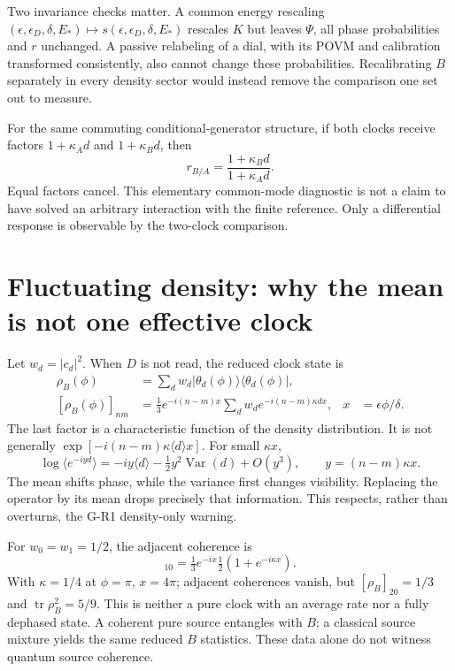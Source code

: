 \documentclass[11pt,a4paper]{article}
\newcommand{\tr}{\operatorname{tr}}
\newcommand{\ket}[1]{|#1\rangle}
\newcommand{\bra}[1]{\langle#1|}
\newcommand{\pr}[1]{\ket{#1}\bra{#1}}
\begin{document}
Two invariance checks matter. A common energy rescaling
$(\epsilon,\epsilon_D,\delta,E_*)\mapsto s(\epsilon,\epsilon_D,\delta,E_*)$
rescales $K$ but leaves $\Psi$, all phase probabilities and $r$ unchanged.
A passive relabeling of a dial, with its POVM and calibration transformed
consistently, also cannot change these probabilities. Recalibrating $B$
separately in every density sector would instead remove the comparison
one set out to measure.

For the same commuting conditional-generator structure, if both clocks
receive factors $1+\kappa_A d$ and $1+\kappa_B d$, then
\begin{equation}
 r_{B/A}=\frac{1+\kappa_Bd}{1+\kappa_Ad}.
\end{equation}
Equal factors cancel. This elementary common-mode diagnostic is not a
claim to have solved an arbitrary interaction with the finite reference.
Only a differential response is observable by the two-clock comparison.

\newpage
\section{Fluctuating density: why the mean is not one effective clock}
Let $w_d=|c_d|^2$. When $D$ is not read, the reduced clock state is
\begin{align}
 \rho_B(\phi)
  &=\sum_d w_d\pr{\theta_d(\phi)},\\
 [\rho_B(\phi)]_{nm}
  &=\frac13 e^{-i(n-m)x}
       \sum_d w_d e^{-i(n-m)\kappa d x},
 &x&=\epsilon\phi/\delta .\label{eq:characteristic}
\end{align}
The last factor is a characteristic function of the density distribution.
It is not generally $\exp[-i(n-m)\kappa\langle d\rangle x]$.
For small $\kappa x$,
\begin{equation}
 \log\langle e^{-iyd}\rangle
 =-iy\langle d\rangle-\tfrac12y^2\operatorname{Var}(d)+O(y^3),
 \qquad y=(n-m)\kappa x .
\end{equation}
The mean shifts phase, while the variance first changes visibility.
Replacing the operator by its mean drops precisely that information.
This respects, rather than overturns, the G-R1 density-only warning.

For $w_0=w_1=1/2$, the adjacent coherence is
\begin{equation}
 [\rho_B]_{10}=\tfrac13e^{-ix}
    \tfrac12(1+e^{-i\kappa x}).
\end{equation}
With $\kappa=1/4$ at $\phi=\pi$, $x=4\pi$; adjacent coherences vanish,
but $[\rho_B]_{20}=1/3$ and $\tr\rho_B^2=5/9$.
This is neither a pure clock with an average rate nor a fully dephased
state. A coherent pure source entangles with $B$; a classical source
mixture yields the same reduced $B$ statistics. These data alone do
not witness quantum source coherence.
\end{document}
